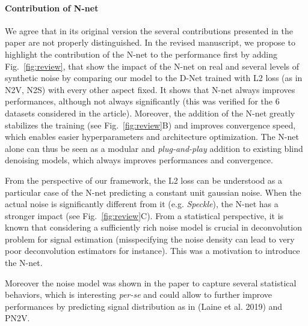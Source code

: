 \documentclass{article}
\begin{document}
\paragraph{Contribution of N-net}
We agree that in its original version the several contributions presented in the paper are not properly distinguished.
In the revised manuscript, we propose to highlight the contribution of the N-net to the performance first by adding Fig.~\ref{fig:review}, that show the impact of the N-net on real and several levels of synthetic noise by comparing our model to the D-Net trained with L2 loss (as in N2V, N2S) with every other aspect fixed.
It shows that N-net always improves performances, although not always significantly (this was verified for the 6 datasets considered in the article). Moreover, the addition of the N-net greatly stabilizes the training (see Fig.~\ref{fig:review}B) and improves convergence speed, which enables easier hyperparameters and architecture optimization.
The N-net alone can thus be seen as a modular and \textit{plug-and-play} addition to existing blind denoising models, which always improves performances and convergence.

From the perspective of our framework, the L2 loss can be understood as a particular case of the N-net predicting a constant unit gaussian noise. When the actual noise is significantly different from it (e.g. \textit{Speckle}), the N-net has a stronger impact (see Fig.~\ref{fig:review}C).
From a statistical perspective,  it is known that considering a sufficiently rich noise model is crucial in deconvolution problem for signal estimation (misspecifying the noise density can lead to very poor deconvolution estimators for instance). This was a motivation to introduce the N-net.

Moreover the noise model was shown in the paper to capture several statistical behaviors, which is interesting \textit{per-se} and could allow to further improve performances by predicting signal distribution as in (Laine et al. 2019) and PN2V.
\end{document}
